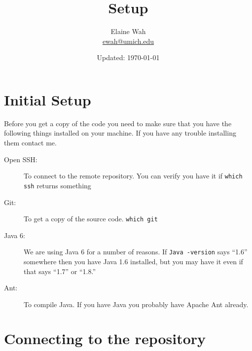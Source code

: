 \documentclass[11pt]{article}
\title{Setup}
\author{
  Elaine Wah \\
  \href{mailto:ewah@umich.edu}{ewah@umich.edu}
}
\date{Updated: \today}
\begin{document}
\maketitle

\section{Initial Setup}

Before you get a copy of the code you need to make sure that you have the
following things installed on your machine. If you have any trouble installing
them contact me.

\begin{description}
\item[Open SSH:] To connect to the remote repository. You can verify you have it
  if \texttt{which ssh} returns something
\item[Git:] To get a copy of the source code. \texttt{which git}
\item[Java 6:] We are using Java 6 for a number of reasons. If \texttt{Java
  -version} says ``1.6'' somewhere then you have Java 1.6 installed, but you may
  have it even if that says ``1.7'' or ``1.8.''
\item[Ant:] To compile Java. If you have Java you probably have Apache Ant already.
\end{description}

\section{Connecting to the repository}
\end{document}
